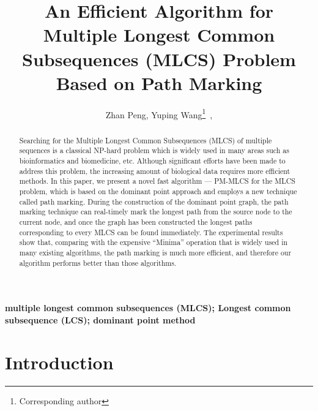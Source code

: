 \documentclass{article}
\begin{document}
\title{An Efficient Algorithm for Multiple Longest Common Subsequences
  (MLCS) Problem Based on Path Marking}

\author{Zhan Peng, Yuping Wang\footnote{Corresponding author}~,}


\maketitle


\begin{abstract}

  Searching for the Multiple Longest Common Subsequences (MLCS) of
  multiple sequences is a classical NP-hard problem which is widely
  used in many areas such as bioinformatics and biomedicine,
  etc. Although significant efforts have been made to address this
  problem, the increasing amount of biological data requires more
  efficient methods. In this paper, we present a novel fast algorithm
  --- PM-MLCS for the MLCS problem, which is based on the dominant
  point approach and employs a new technique called path
  marking. During the construction of the dominant point graph, the
  path marking technique can real-timely mark the longest path from
  the source node to the current node, and once the graph has been
  constructed the longest paths corresponding to every MLCS can be
  found immediately. The experimental results show that, comparing
  with the expensive ``Minima'' operation that is widely used in many
  existing algorithms, the path marking is much more efficient, and
  therefore our algorithm performs better than those algorithms.

\end{abstract}

\textbf{multiple longest common subsequences (MLCS); Longest common
  subsequence (LCS); dominant point method}


\section{Introduction}
\label{sec:introduction}
\end{document}
